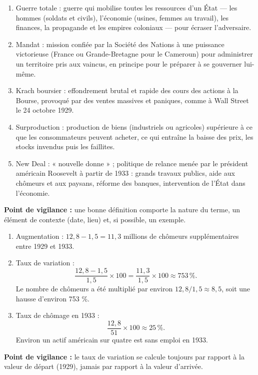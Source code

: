 \documentclass[11pt]{article}
\newcommand{\cle}[1]{{\popxbold\color{popdark}#1}}
\begin{document}
\begin{corrige}
\begin{enumerate}
\item \cle{Guerre totale} : guerre qui mobilise toutes les ressources d'un État — les hommes (soldats et civils), l'économie (usines, femmes au travail), les finances, la propagande et les empires coloniaux — pour écraser l'adversaire.
\item \cle{Mandat} : mission confiée par la Société des Nations à une puissance victorieuse (France ou Grande-Bretagne pour le Cameroun) pour administrer un territoire pris aux vaincus, en principe pour le préparer à se gouverner lui-même.
\item \cle{Krach boursier} : effondrement brutal et rapide des cours des actions à la Bourse, provoqué par des ventes massives et paniques, comme à Wall Street le 24 octobre 1929.
\item \cle{Surproduction} : production de biens (industriels ou agricoles) supérieure à ce que les consommateurs peuvent acheter, ce qui entraîne la baisse des prix, les stocks invendus puis les faillites.
\item \cle{New Deal} : « nouvelle donne » ; politique de relance menée par le président américain Roosevelt à partir de 1933 : grands travaux publics, aide aux chômeurs et aux paysans, réforme des banques, intervention de l'État dans l'économie.
\end{enumerate}
\textbf{Point de vigilance :} une bonne définition comporte la nature du terme, un élément de contexte (date, lieu) et, si possible, un exemple.
\end{corrige}

\begin{corrige}
\begin{enumerate}
\item Augmentation : $12{,}8 - 1{,}5 = 11{,}3$ millions de chômeurs supplémentaires entre 1929 et 1933.
\item Taux de variation :
\[ \frac{12{,}8 - 1{,}5}{1{,}5} \times 100 = \frac{11{,}3}{1{,}5} \times 100 \approx 753\,\%. \]
Le nombre de chômeurs a été multiplié par environ $12{,}8 / 1{,}5 \approx 8{,}5$, soit une hausse d'environ 753 \%.
\item Taux de chômage en 1933 :
\[ \frac{12{,}8}{51} \times 100 \approx 25\,\%. \]
Environ un actif américain sur quatre est sans emploi en 1933.
\end{enumerate}
\textbf{Point de vigilance :} le taux de variation se calcule toujours par rapport à la valeur de départ (1929), jamais par rapport à la valeur d'arrivée.
\end{corrige}
\end{document}
